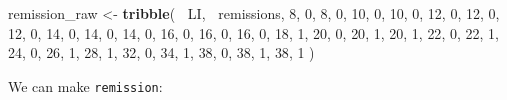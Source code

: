 \documentclass[]{book}
\newenvironment{Shaded}{\begin{snugshade}}{\end{snugshade}}
\newcommand{\DataTypeTok}[1]{\textcolor[rgb]{0.13,0.29,0.53}{#1}}
\newcommand{\DecValTok}[1]{\textcolor[rgb]{0.00,0.00,0.81}{#1}}
\newcommand{\KeywordTok}[1]{\textcolor[rgb]{0.13,0.29,0.53}{\textbf{#1}}}
\newcommand{\NormalTok}[1]{#1}
\newcommand{\OperatorTok}[1]{\textcolor[rgb]{0.81,0.36,0.00}{\textbf{#1}}}
\newcommand{\StringTok}[1]{\textcolor[rgb]{0.31,0.60,0.02}{#1}}
\begin{document}
\begin{Shaded}
\begin{Highlighting}[]
\NormalTok{remission_raw <-}
\StringTok{  }\KeywordTok{tribble}\NormalTok{(}
    \OperatorTok{~}\NormalTok{LI, }\OperatorTok{~}\NormalTok{remissions,}
    \DecValTok{8}\NormalTok{, }\DecValTok{0}\NormalTok{,}
    \DecValTok{8}\NormalTok{, }\DecValTok{0}\NormalTok{,}
    \DecValTok{10}\NormalTok{, }\DecValTok{0}\NormalTok{,}
    \DecValTok{10}\NormalTok{, }\DecValTok{0}\NormalTok{,}
    \DecValTok{12}\NormalTok{, }\DecValTok{0}\NormalTok{,}
    \DecValTok{12}\NormalTok{, }\DecValTok{0}\NormalTok{,}
    \DecValTok{12}\NormalTok{, }\DecValTok{0}\NormalTok{,}
    \DecValTok{14}\NormalTok{, }\DecValTok{0}\NormalTok{,}
    \DecValTok{14}\NormalTok{, }\DecValTok{0}\NormalTok{,}
    \DecValTok{14}\NormalTok{, }\DecValTok{0}\NormalTok{,}
    \DecValTok{16}\NormalTok{, }\DecValTok{0}\NormalTok{,}
    \DecValTok{16}\NormalTok{, }\DecValTok{0}\NormalTok{,}
    \DecValTok{16}\NormalTok{, }\DecValTok{0}\NormalTok{,}
    \DecValTok{18}\NormalTok{, }\DecValTok{1}\NormalTok{,}
    \DecValTok{20}\NormalTok{, }\DecValTok{0}\NormalTok{,}
    \DecValTok{20}\NormalTok{, }\DecValTok{1}\NormalTok{,}
    \DecValTok{20}\NormalTok{, }\DecValTok{1}\NormalTok{,}
    \DecValTok{22}\NormalTok{, }\DecValTok{0}\NormalTok{,}
    \DecValTok{22}\NormalTok{, }\DecValTok{1}\NormalTok{,}
    \DecValTok{24}\NormalTok{, }\DecValTok{0}\NormalTok{,}
    \DecValTok{26}\NormalTok{, }\DecValTok{1}\NormalTok{,}
    \DecValTok{28}\NormalTok{, }\DecValTok{1}\NormalTok{,}
    \DecValTok{32}\NormalTok{, }\DecValTok{0}\NormalTok{,}
    \DecValTok{34}\NormalTok{, }\DecValTok{1}\NormalTok{,}
    \DecValTok{38}\NormalTok{, }\DecValTok{0}\NormalTok{,}
    \DecValTok{38}\NormalTok{, }\DecValTok{1}\NormalTok{,}
    \DecValTok{38}\NormalTok{, }\DecValTok{1}
\NormalTok{  )}
\end{Highlighting}
\end{Shaded}

We can make \texttt{remission}:

\begin{Shaded}
\end{Shaded}
\end{document}
